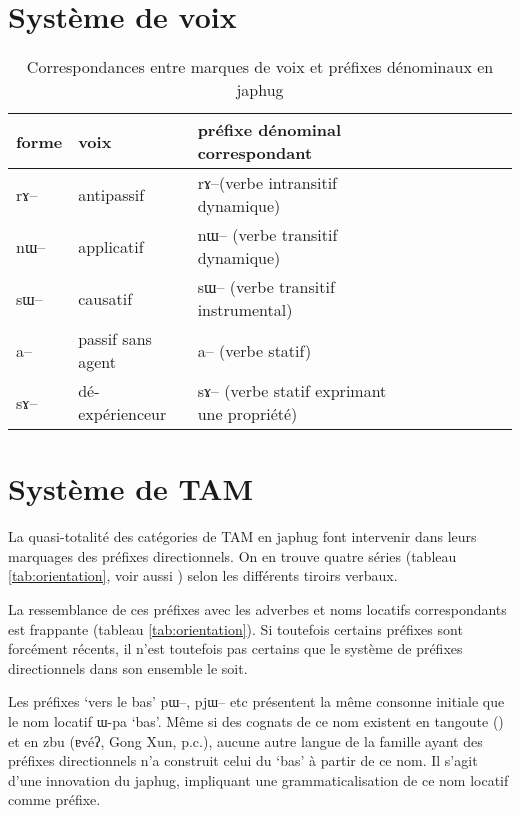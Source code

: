 \documentclass[oldfontcommands,oneside,a4paper,11pt]{article}
\newcommand{\ipa}[1]{{\phon \mbox{#1}}} %
\begin{document}
\section{Système de voix}
 \citealt{jackson14morpho}
\citealt{jacques10refl}
\citealt{lai13affixale}
\begin{table}[h]
\caption{Correspondances entre marques de voix et préfixes dénominaux en japhug} \centering \label{tab:denominal}
\begin{tabular}{lllllllll} \toprule
forme & voix & préfixe dénominal correspondant \\
\midrule
\ipa{rɤ}-- & antipassif &    \ipa{rɤ}--(verbe intransitif dynamique) \\
\ipa{nɯ}-- & applicatif &    \ipa{nɯ}-- (verbe transitif dynamique) \\
\ipa{sɯ}-- & causatif &    \ipa{sɯ}-- (verbe transitif instrumental)\\
\ipa{a}-- & passif sans agent &    \ipa{a}-- (verbe statif) \\
\ipa{sɤ}--  & dé-expérienceur &    \ipa{sɤ}-- (verbe statif exprimant une propriété)\\
    \bottomrule
\end{tabular}
\end{table}

\citealt{jacques12incorp}
\citealt{jacques14antipassive}
 
\citealt{jacques15causative}
\citealt{jacques15spontaneous}
\section{Système de TAM}
La quasi-totalité des catégories de TAM en japhug font intervenir dans leurs marquages des préfixes directionnels. On en trouve quatre séries (tableau \ref{tab:orientation}, voir aussi \citealt[266]{jacques14linking}) selon les différents tiroirs verbaux. 

La ressemblance de ces préfixes avec les adverbes et noms locatifs correspondants est frappante (tableau \ref{tab:orientation}). Si toutefois certains préfixes sont forcément récents, il n'est toutefois pas certains que le système de préfixes directionnels dans son ensemble le soit.

Les préfixes `vers le bas' \ipa{pɯ--}, \ipa{pjɯ--} etc présentent la même consonne initiale que le nom locatif \ipa{ɯ-pa} `bas'. Même si des cognats de ce nom existent en tangoute (\citealt{jacques14tangoute}) et en zbu (\ipa{ɐvéʔ}, Gong Xun, p.c.), aucune autre langue de la famille ayant des préfixes directionnels n'a construit celui du `bas' à partir de ce nom. Il s'agit d'une innovation du japhug, impliquant une grammaticalisation de ce nom locatif comme préfixe.
\end{document}
